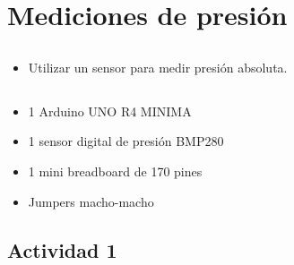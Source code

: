 \chapter{Mediciones de presión}
\section{\obj}
\capacidad
\begin{itemize}
\item Utilizar un sensor para medir presión absoluta.
\end{itemize}

\section{\mat}
\begin{itemize}
\item 1 Arduino UNO R4 MINIMA
\item 1 sensor digital de presión BMP280
\item 1 mini breadboard de 170 pines
\item Jumpers macho-macho
\end{itemize}

\section{Actividad 1}
